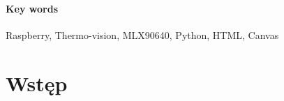 \documentclass[a4paper,twoside,12pt]{book}
\newcounter{stronyPozaNumeracja}
\begin{document}
\subsubsection*{Key words}  
\begin{otherlanguage}{british}
Raspberry, Thermo-vision, MLX90640, Python, HTML, Canvas
\end{otherlanguage}




\tableofcontents

\setcounter{stronyPozaNumeracja}{\value{page}}
\mainmatter
\pagestyle{empty}

\cleardoublepage

\pagestyle{NumeryStronNazwyRozdzialow}


\chapter{Wstęp}
\label{ch:wstep}
\end{document}
